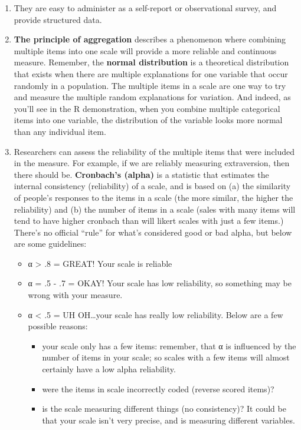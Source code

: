 \documentclass[
  letterpaper,
  DIV=11,
  numbers=noendperiod,
  oneside]{scrreprt}
\begin{document}
\begin{enumerate}
\def\labelenumi{\arabic{enumi}.}
\item
  They are easy to administer as a self-report or observational survey,
  and provide structured data.
\item
  \textbf{The principle of aggregation} describes a phenomenon where
  combining multiple items into one scale will provide a more reliable
  and continuous measure. Remember, the \textbf{normal distribution} is
  a theoretical distribution that exists when there are multiple
  explanations for one variable that occur randomly in a population. The
  multiple items in a scale are one way to try and measure the multiple
  random explanations for variation. And indeed, as you'll see in the R
  demonstration, when you combine multiple categorical items into one
  variable, the distribution of the variable looks more normal than any
  individual item.
\item
  Researchers can assess the reliability of the multiple items that were
  included in the measure. For example, if we are reliably measuring
  extraversion, then there should be. \textbf{Cronbach's (alpha)} is a
  statistic that estimates the internal consistency (reliability) of a
  scale, and is based on (a) the similarity of people's responses to the
  items in a scale (the more similar, the higher the reliability) and
  (b) the number of items in a scale (sales with many items will tend to
  have higher cronbach than will likert scales with just a few items.)
  There's no official ``rule'' for what's considered good or bad alpha,
  but below are some guidelines:

  \begin{itemize}
  \item
    α \textgreater{} .8 = GREAT! Your scale is reliable
  \item
    α = .5 - .7 = OKAY! Your scale has low reliability, so something may
    be wrong with your measure.
  \item
    α \textless{} .5 = UH OH\ldots your scale has really low
    reliability. Below are a few possible reasons:

    \begin{itemize}
    \item
      your scale only has a few items: remember, that α is influenced by
      the number of items in your scale; so scales with a few items will
      almost certainly have a low alpha reliability.
    \item
      were the items in scale incorrectly coded (reverse scored items)?
    \item
      is the scale measuring different things (no consistency)? It could
      be that your scale isn't very precise, and is measuring different
      variables.
    \end{itemize}
  \end{itemize}
\end{enumerate}
\end{document}

